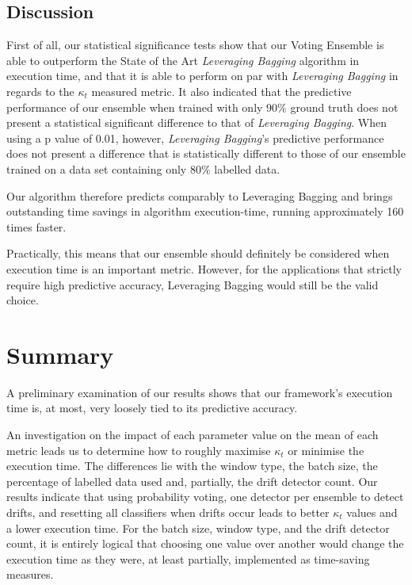 \subsection{Discussion}
First of all, our statistical significance tests show that our Voting Ensemble is able to outperform the State of the Art \textit{Leveraging Bagging} algorithm in execution time, and that it is able to perform on par with \textit{Leveraging Bagging} in regards to the $\kappa_t$ measured metric. It also indicated that the predictive performance of our ensemble when trained with only $90\%$ ground truth does not present a statistical significant difference to that of \textit{Leveraging Bagging}. When using a p value of 0.01, however, \textit{Leveraging Bagging}'s predictive performance does not present a difference that is statistically different to those of our ensemble trained on a data set containing only $80\%$ labelled data.

Our algorithm therefore predicts comparably to Leveraging Bagging and brings outstanding time savings in algorithm execution-time, running approximately 160 times faster.

Practically, this means that our ensemble should definitely be considered when execution time is an important metric. However, for the applications that strictly require high predictive accuracy, Leveraging Bagging would still be the valid choice.


\section{Summary}
A preliminary examination of our results shows that our framework's execution time is, at most, very loosely tied to its predictive accuracy.

An investigation on the impact of each parameter value on the mean of each metric leads us to determine how to roughly maximise $\kappa_t$ or minimise the execution time.
The differences lie with the window type, the batch size, the percentage of labelled data used and, partially, the drift detector count. Our results indicate that using probability voting, one detector per ensemble to detect drifts, and resetting all classifiers when drifts occur leads to better $\kappa_t$ values and a lower execution time. For the batch size, window type, and the drift detector count, it is entirely logical that choosing one value over another would change the execution time as they were, at least partially, implemented as time-saving measures.

